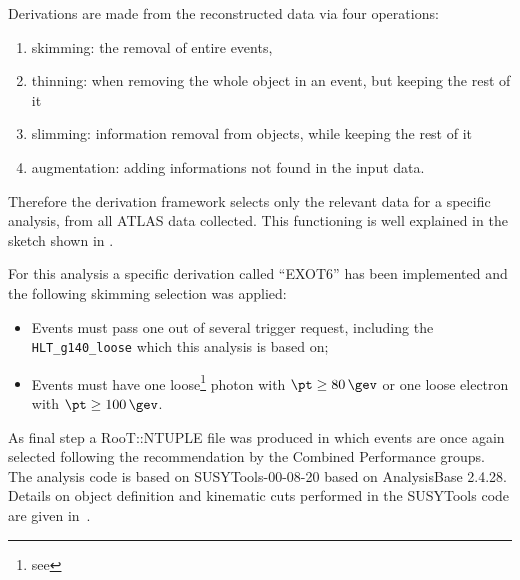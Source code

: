 Derivations are made from the reconstructed data via four operations:
\begin{enumerate}
\item skimming: the removal of entire events,
\item thinning: when removing the whole object in an event, but keeping the rest of it 
\item slimming: information removal from objects, while keeping the rest of it 
\item augmentation: adding informations not found in the input data.
\end{enumerate}

Therefore the derivation framework selects only the relevant data for a specific analysis, from all ATLAS data collected. This functioning is well explained in the sketch shown in \Fig{\ref{fig:derivation}}.

For this analysis a specific derivation called ``EXOT6'' has been implemented and the following skimming selection was applied:
\begin{itemize}
\item Events must pass one out of several trigger request, including the \verb!HLT_g140_loose! which this analysis is based on;
\item Events must have one loose\footnote{see \Sect{\ref{photons}}} photon with $\pt\ge\SI{80}{\gev}$ or one loose electron with $\pt\ge\SI{100}{\gev}$.
\end{itemize}

As final step a RooT::NTUPLE file was produced in which events are once again selected following the recommendation by the Combined Performance groups. The analysis code is based on SUSYTools-00-08-20 based on AnalysisBase 2.4.28. Details on object definition and kinematic cuts performed in the SUSYTools code are given in~\cite{twiki:SUSYTools}.



